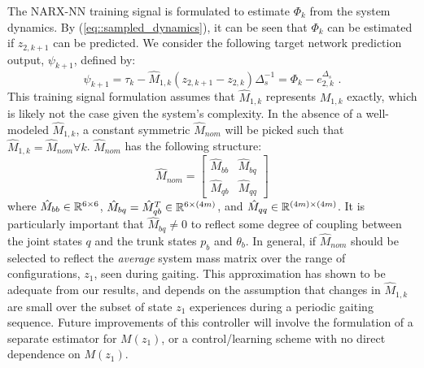 The  NARX-NN training signal is formulated to estimate $\Phi_{k}$ from the system dynamics.
By (\ref{eq::sampled_dynamics}), it can be seen that $\Phi_{k}$ can be estimated if ${z}_{2,k+1}$ can be predicted. 
We consider the following target network prediction output, $\psi_{k+1}$,  defined by:
	\vspace{-2mm}
	\begin{equation}
		\psi_{k+1} = \tau_{k} - \hat{M}_{1,k}({z}_{2,k+1} - {z}_{2,k})\Delta_{s}^{-1} = \Phi_{k} - {e}_{2,k}^{\Delta_{s}} \text{ .}
		\label{eq::training_signal}
	\end{equation}
This training signal formulation assumes that $\hat{M}_{1,k}$ represents $M_{1,k}$ exactly, which is likely not 
the case given the system's complexity. In the absence of a well-modeled $\hat{M}_{1,k}$, a constant symmetric $\hat{M}_{nom}$ 
will be picked such that $\hat{M}_{1,k} = \hat{M}_{nom} \forall k$. $\hat{M}_{nom}$ has the following structure:
	\begin{equation}
		\hat{M}_{nom} = \left[
			\begin{array}{cc}
			\hat{M}_{bb}	&	 \hat{M}_{bq}\\
			\hat{M}_{qb}	&	 \hat{M}_{qq}
			\end{array}
		\right]
	\end{equation}
where 	$\hat{M}_{bb}\in \mathbb{R}^{6\times6}$, 
		$\hat{M}_{bq}=\hat{M}_{qb}^{T} \in \mathbb{R}^{6\times(4m)}$, and  
		$\hat{M}_{qq}\in \mathbb{R}^{(4m)\times(4m)}$. 
It is particularly important that $\hat{M}_{bq}\neq0$ to reflect some degree of coupling between the joint states $q$ and the trunk states $p_{b}$ and $\theta_{b}$. 
In general, if $\hat{M}_{nom}$ should be selected to reflect the \emph{average} system mass matrix over the range of configurations, 
$z_{1}$, seen during gaiting. This approximation has shown to be adequate from our results, and depends on the assumption that changes in $\hat{M}_{1,k}$ 
are small  over the subset of state $z_{1}$ experiences during a periodic gaiting sequence. Future improvements of this controller will
involve the formulation of a separate estimator for $M(z_{1})$, or a control/learning scheme with no direct dependence on $M(z_{1})$.

